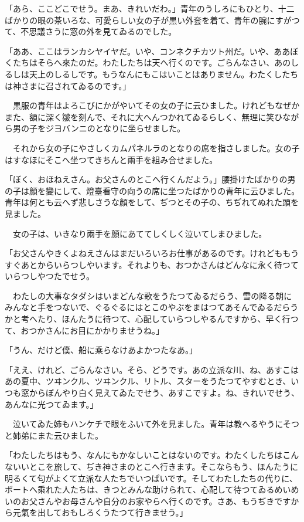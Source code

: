 \documentclass[tate,paper=b6j,jafontsize=9pt]{jlreq}
\begin{document}
「あら、ここどこでせう。まあ、きれいだわ。」青年のうしろにもひとり、十二ばかりの眼の茶いろな、可愛らしい女の子が黒い外套を着て、青年の腕にすがつて、不思議さうに窓の外を見てゐるのでした。

「ああ、ここはランカシヤイヤだ。いや、コンネクチカツト州だ。いや、ああぼくたちはそらへ來たのだ。わたしたちは天へ行くのです。ごらんなさい、あのしるしは天上のしるしです。もうなんにもこはいことはありません。わたくしたちは神さまに召されてゐるのです。」

　黒服の青年はよろこびにかがやいてその女の子に云ひました。けれどもなぜかまた、額に深く皺を刻んで、それに大へんつかれてゐるらしく、無理に笑ひながら男の子をジヨバンニのとなりに坐らせました。

　それから女の子にやさしくカムパネルラのとなりの席を指さしました。女の子はすなほにそこへ坐つてきちんと兩手を組み合せました。

「ぼく、おほねえさん。お父さんのとこへ行くんだよう。」腰掛けたばかりの男の子は顏を變にして、燈臺看守の向うの席に坐つたばかりの青年に云ひました。青年は何とも云へず悲しさうな顏をして、ぢつとその子の、ちぢれてぬれた頭を見ました。

　女の子は、いきなり兩手を顏にあててしくしく泣いてしまひました。

「お父さんやきくよねえさんはまだいろいろお仕事があるのです。けれどももうすぐあとからいらつしやいます。それよりも、おつかさんはどんなに永く待つていらつしやつたでせう。

　わたしの大事なタダシはいまどんな歌をうたつてゐるだらう、雪の降る朝にみんなと手をつないで、ぐるぐるにはとこのやぶをまはつてあそんでゐるだらうかと考へたり、ほんたうに待つて、心配していらつしやるんですから、早く行つて、おつかさんにお目にかかりませうね。」

「うん、だけど僕、船に乘らなけあよかつたなあ。」

「ええ、けれど、ごらんなさい。そら、どうです。あの立派な川、ね、あすこはあの夏中、ツヰンクル、ツヰンクル、リトル、スターをうたつてやすむとき、いつも窓からぼんやり白く見えてゐたでせう、あすこですよ。ね、きれいでせう、あんなに光つてゐます。」

　泣いてゐた姉もハンケチで眼をふいて外を見ました。青年は教へるやうにそつと姉弟にまた云ひました。

「わたしたちはもう、なんにもかなしいことはないのです。わたくしたちはこんないいとこを旅して、ぢき神さまのとこへ行きます。そこならもう、ほんたうに明るくて匂がよくて立派な人たちでいつぱいです。そしてわたしたちの代りに、ボートへ乘れた人たちは、きつとみんな助けられて、心配して待つてゐるめいめいのお父さんやお母さんや自分のお家やらへ行くのです。さあ、もうぢきですから元氣を出しておもしろくうたつて行きませう。」
\end{document}
